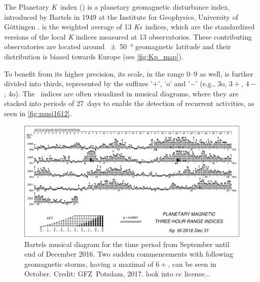 The Planetary \textit{K}~index (\Kp{}) is a planetary geomagnetic disturbance index, introduced by Bartels in 1949 at the Institute for Geophysics, University of Göttingen \citep{Bartels1949}. \Kp{} is the weighted average of 13 \textit{Ks}~indices, which are the standardized versions of the local \textit{K} indices measured at 13 observatories. These contributing observatories are located around \SI{+-50}{\degree} geomagnetic latitude and their distribution is biased towards Europe (see \autoref{fig:Kp_map}).
\begin{figure}[htb]
\end{figure}

To benefit from its higher precision, its scale, in the range 0--9 as well, is further divided into thirds, represented by the suffixes '$+$', 'o' and '$-$' (e.g., 3o, $3+$, $4-$, 4o). The \Kp{}~indices are often visualized in musical diagrams, where they are stacked into periods of 27~days to enable the detection of recurrent activities, as seen in \autoref{fig:musi1612}.
\begin{figure}[htb]
	\centering
	\includegraphics[width=\textwidth]{images/musi1612.pdf}
	\caption{Bartels musical \Kp{} diagram for the time period from September until end of December 2016. Two sudden commencements with following geomagnetic storms, having a maximal \Kp{} of $6+$, can be seen in October. Credit: GFZ~Potsdam, 2017. look into cc license...}
	\label{fig:musi1612}
\end{figure}

